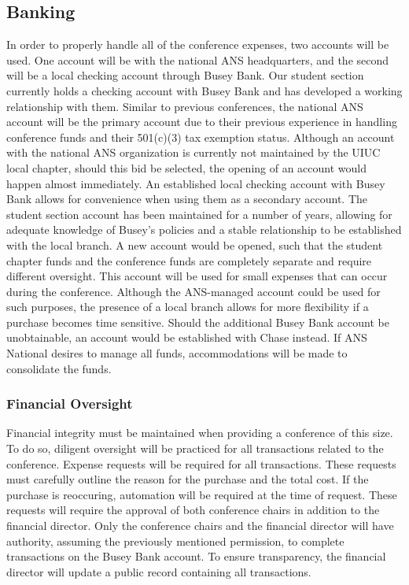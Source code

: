 \subsection{Banking}

In order to properly handle all of the conference expenses, two accounts will be used. One account will be with the national ANS headquarters, and the second will be a local checking account through Busey Bank. Our student section currently holds a checking account with Busey Bank and has developed a working relationship with them. Similar to previous conferences, the national ANS account will be the primary account due to their previous experience in handling conference funds and their 501(c)(3) tax exemption status. Although an account with the national ANS organization is currently not maintained by the UIUC local chapter, should this bid be selected, the opening of an account would happen almost immediately. An established local checking account with Busey Bank allows for convenience when using them as a secondary account. The student section account has been maintained for a number of years, allowing for adequate knowledge of Busey’s policies and a stable relationship to be established with the local branch. A new account would be opened, such that the student chapter funds and the conference funds are completely separate and require different oversight. This account will be used for small expenses that can occur during the conference. Although the ANS-managed account could be used for such purposes, the presence of a local branch allows for more flexibility if a purchase becomes time sensitive. Should the additional Busey Bank account be unobtainable, an account would be established with Chase instead. If ANS National desires to manage all funds, accommodations will be made to consolidate the funds.

\subsubsection{Financial Oversight}
Financial integrity must be maintained when providing a conference of this size. To do so, diligent oversight will be practiced for all transactions related to the conference. Expense requests will be required for all transactions. These requests must carefully outline the reason for the purchase and the total cost. If the purchase is reoccuring, automation will be required at the time of request. These requests will require the approval of both conference chairs in addition to the financial director. Only the conference chairs and the financial director will have authority, assuming the previously mentioned permission, to complete transactions on the Busey Bank account. To ensure transparency, the financial director will update a public record containing all transactions. 